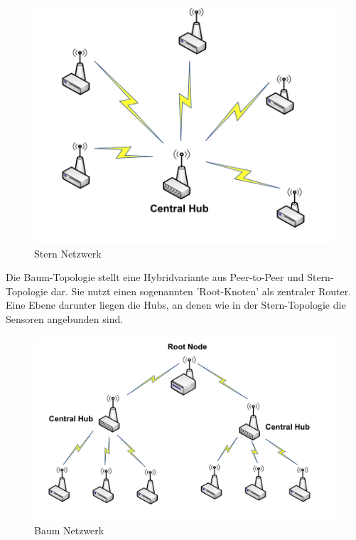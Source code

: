 \begin{figure}[H] 
	\centering
	\includegraphics[scale=0.5]{Bilder/star}
	\caption{Stern Netzwerk\cite{d:kosmerchock}}
	\label{f:star}
\end{figure}

Die Baum-Topologie stellt eine Hybridvariante aus Peer-to-Peer und Stern-Topologie dar. Sie nutzt einen sogenannten 'Root-Knoten' als zentraler Router. Eine Ebene darunter liegen die Hubs, an denen wie in der Stern-Topologie die Sensoren angebunden sind. \\

\begin{figure}[H] 
	\centering
	\includegraphics[scale=0.5]{Bilder/tree}
	\caption{Baum Netzwerk\cite{d:kosmerchock}}
	\label{f:tree}
\end{figure}

